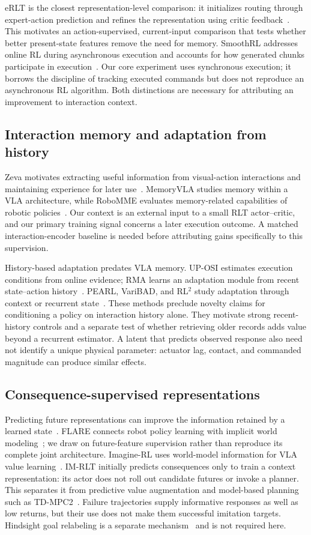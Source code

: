 \documentclass[10pt,letterpaper]{article}
\begin{document}
eRLT is the closest representation-level comparison: it initializes routing through expert-action prediction and refines the representation using critic feedback~\citep{erlt}. This motivates an action-supervised, current-input comparison that tests whether better present-state features remove the need for memory. SmoothRL addresses online RL during asynchronous execution and accounts for how generated chunks participate in execution~\citep{smoothrl}. Our core experiment uses synchronous execution; it borrows the discipline of tracking executed commands but does not reproduce an asynchronous RL algorithm. Both distinctions are necessary for attributing an improvement to interaction context.

\subsection{Interaction memory and adaptation from history}
Zeva motivates extracting useful information from visual-action interactions and maintaining experience for later use~\citep{zeva}. MemoryVLA studies memory within a VLA architecture, while RoboMME evaluates memory-related capabilities of robotic policies~\citep{memoryvla,robomme}. Our context is an external input to a small RLT actor--critic, and our primary training signal concerns a later execution outcome. A matched interaction-encoder baseline is needed before attributing gains specifically to this supervision.

History-based adaptation predates VLA memory. UP-OSI estimates execution conditions from online evidence; RMA learns an adaptation module from recent state--action history~\citep{uposi,rma}. PEARL, VariBAD, and RL$^2$ study adaptation through context or recurrent state~\citep{pearl,varibad,rl2}. These methods preclude novelty claims for conditioning a policy on interaction history alone. They motivate strong recent-history controls and a separate test of whether retrieving older records adds value beyond a recurrent estimator. A latent that predicts observed response also need not identify a unique physical parameter: actuator lag, contact, and commanded magnitude can produce similar effects.

\subsection{Consequence-supervised representations}
Predicting future representations can improve the information retained by a learned state~\citep{spr}. FLARE connects robot policy learning with implicit world modeling~\citep{flare}; we draw on future-feature supervision rather than reproduce its complete joint architecture. Imagine-RL uses world-model information for VLA value learning~\citep{imagine}. IM-RLT initially predicts consequences only to train a context representation: its actor does not roll out candidate futures or invoke a planner. This separates it from predictive value augmentation and model-based planning such as TD-MPC2~\citep{tdmpc2}. Failure trajectories supply informative responses as well as low returns, but their use does not make them successful imitation targets. Hindsight goal relabeling is a separate mechanism~\citep{her} and is not required here.
\end{document}
